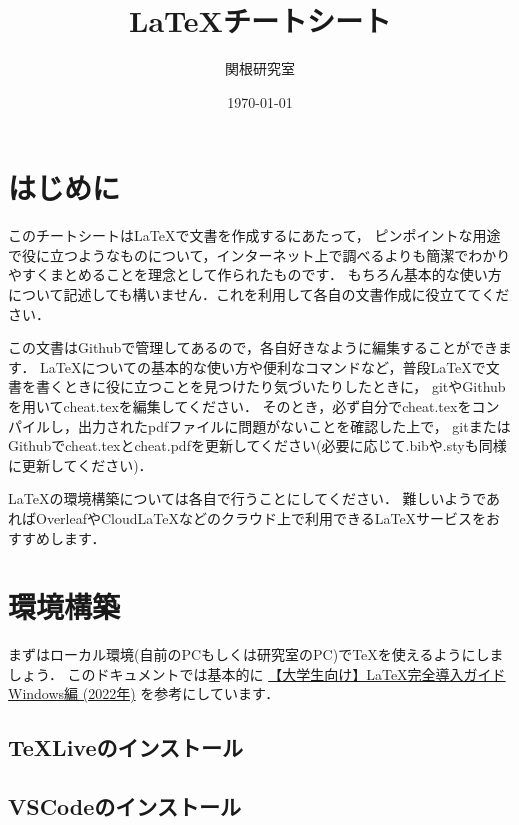 \documentclass[a4paper,11pt]{ltjsreport}
\numberwithin{equation}{section}
\theoremstyle{definition}
\begin{document}
\title{{\LaTeX}チートシート}
\author{関根研究室}
\date{\today}
\maketitle



\chapter*{はじめに}

このチートシートは{\LaTeX}で文書を作成するにあたって，
ピンポイントな用途で役に立つようなものについて，インターネット上で調べるよりも簡潔でわかりやすくまとめることを理念として作られたものです．
もちろん基本的な使い方について記述しても構いません．これを利用して各自の文書作成に役立ててください．

この文書はGithubで管理してあるので，各自好きなように編集することができます．
{\LaTeX}についての基本的な使い方や便利なコマンドなど，普段{\LaTeX}で文書を書くときに役に立つことを見つけたり気づいたりしたときに，
gitやGithubを用いてcheat.texを編集してください．
そのとき，必ず自分でcheat.texをコンパイルし，出力されたpdfファイルに問題がないことを確認した上で，
gitまたはGithubでcheat.texとcheat.pdfを更新してください(必要に応じて.bibや.styも同様に更新してください)．

{\LaTeX}の環境構築については各自で行うことにしてください．
難しいようであればOverleafやCloudLaTeXなどのクラウド上で利用できる{\LaTeX}サービスをおすすめします．

\setcounter{tocdepth}{3}
\tableofcontents



\chapter{環境構築}

まずはローカル環境(自前のPCもしくは研究室のPC)でTeXを使えるようにしましょう．
このドキュメントでは基本的に
\href{https://qiita.com/passive-radio/items/623c9a35e86b6666b89e}{【大学生向け】LaTeX完全導入ガイド Windows編 (2022年)}
を参考にしています．

\section{TeXLiveのインストール}


\section{VSCodeのインストール}
\end{document}
